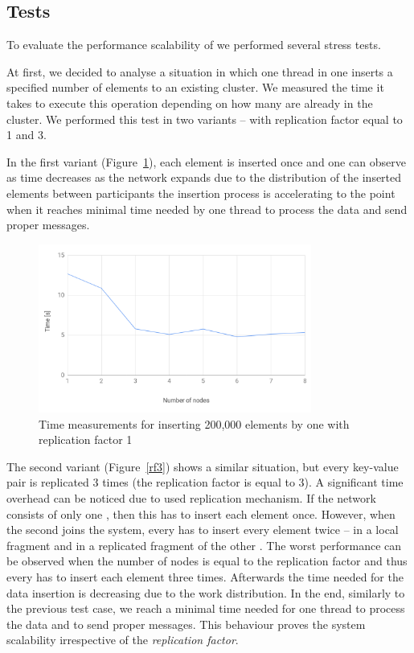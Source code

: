     \subsection{Tests}
    
        To evaluate the performance scalability of \DHTS we performed several stress tests.
        
        At first, we decided to analyse a situation in which one thread in one \Node inserts a specified number of elements to an existing \DHTS cluster. 
        We measured the time it takes to execute this operation depending on how many \Nodes are already in the cluster.
        We performed this test in two variants -- with replication factor equal to 1 and 3.
        
        In the first variant (Figure~\ref{rf1}), each element is inserted once and one can observe as time decreases as the network expands 
        due to the distribution of the inserted elements between participants the insertion process is accelerating to the point when it reaches minimal time needed by one thread to process the data and send proper messages.
        
        \begin{figure}[H]
            \centering
            \includegraphics[width=0.8\textwidth]{thesis/figures/rf1.png}
            \caption{Time measurements for inserting 200,000 elements by one \Node with replication factor 1}
            \label{rf1}
        \end{figure}
    
        The second variant (Figure~\ref{rf3}) shows  a similar situation, but every key-value pair is replicated 3 times (the replication factor is equal to 3). A significant time overhead can be noticed due to used replication mechanism.
        If the network consists of only one \Node, then this \Node has to insert each element once. However, when the second \Node joins the system, every \Node has to insert every element twice -- in a local \PHT fragment and in a replicated \PHT fragment of the other \Node. The worst performance can be observed when the number of nodes is equal to the replication factor and thus every \Node has to insert each element three times.
        Afterwards the time needed for the data insertion is decreasing due to the work distribution. In the end, similarly to the previous test case, we reach a minimal time needed for one thread to process the data and to send proper messages. This behaviour proves the system scalability irrespective of the \textit{replication factor}.
        
